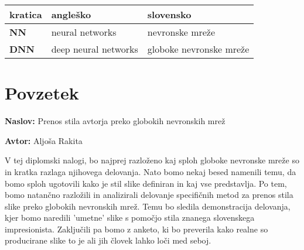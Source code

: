 \documentclass[a4paper, 12pt]{book}
\newcommand{\ttitle}{Prenos stila avtorja preko globokih nevronskih mrež}
\newcommand{\tauthor}{Aljoša Rakita}
\newcommand{\clearemptydoublepage}{\newpage{\pagestyle{empty}\cleardoublepage}}
\begin{document}
\begin{comment}
\begin{tabular}{l|l|l}
  {\bf kratica} & {\bf angleško} & {\bf slovensko} \\ \hline
  {\bf NN} & neural networks & nevronske mreže \\
  {\bf DNN} & deep neural networks & globoke nevronske mreže \\
  \dots & \dots & \dots \\
\end{tabular}
\end{comment}

\noindent\begin{tabular}{p{}|p{}|p{}}    %
  {\bf kratica} & {\bf angleško}                             & {\bf slovensko} \\ \hline
  {\bf NN} & neural networks & nevronske mreže \\
  {\bf DNN} & deep neural networks & globoke nevronske mreže \\
\end{tabular}


\clearemptydoublepage

\chapter*{Povzetek}

\noindent\textbf{Naslov:} \ttitle
\bigskip

\noindent\textbf{Avtor:} \tauthor
\bigskip

\noindent V tej diplomski nalogi, bo najprej razloženo kaj sploh globoke nevronske mreže so in kratka razlaga njihovega delovanja. Nato bomo nekaj besed namenili temu, da bomo sploh ugotovili kako je stil slike definiran in kaj vse predstavlja. Po tem, bomo natančno razložili in analizirali delovanje specifičnih metod za prenos stila slike preko globokih nevronskih mrež. Temu bo sledila demonstracija delovanja, kjer bomo naredili 'umetne' slike s pomočjo stila znanega slovenskega impresionista. Zaključili pa bomo z anketo, ki bo preverila kako realne so producirane slike to je ali jih človek lahko loči med seboj.
\bigskip
\end{document}
